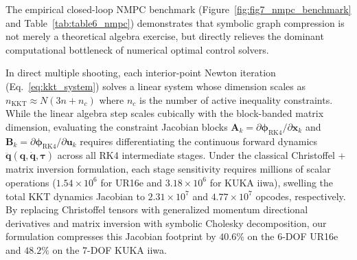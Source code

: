 \documentclass[fleqn,10pt]{article}
\begin{document}
The empirical closed-loop NMPC benchmark (Figure~\ref{fig:fig7_nmpc_benchmark} and Table~\ref{tab:table6_nmpc}) demonstrates that symbolic graph compression is not merely a theoretical algebra exercise, but directly relieves the dominant computational bottleneck of numerical optimal control solvers.

In direct multiple shooting, each interior-point Newton iteration (Eq.~\eqref{eq:kkt_system}) solves a linear system whose dimension scales as $n_{\text{KKT}} \approx N(3n + n_c)$ where $n_c$ is the number of active inequality constraints. While the linear algebra step scales cubically with the block-banded matrix dimension, evaluating the constraint Jacobian blocks $\bm{A}_k = \partial \bm{\phi}_{\text{RK4}}/\partial \bm{x}_k$ and $\bm{B}_k = \partial \bm{\phi}_{\text{RK4}}/\partial \bm{u}_k$ requires differentiating the continuous forward dynamics $\ddot{\bm{q}}(\bm{q},\dot{\bm{q}},\bm{\tau})$ across all RK4 intermediate stages. Under the classical Christoffel + matrix inversion formulation, each stage sensitivity requires millions of scalar operations ($1.54 \times 10^6$ for UR16e and $3.18 \times 10^6$ for KUKA iiwa), swelling the total KKT dynamics Jacobian to $2.31 \times 10^7$ and $4.77 \times 10^7$ opcodes, respectively. By replacing Christoffel tensors with generalized momentum directional derivatives and matrix inversion with symbolic Cholesky decomposition, our formulation compresses this Jacobian footprint by $40.6\%$ on the 6-DOF UR16e and $48.2\%$ on the 7-DOF KUKA iiwa.
\end{document}
